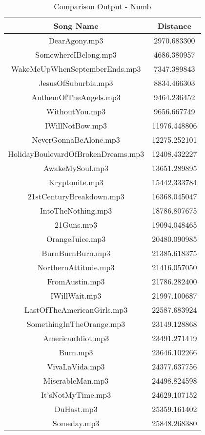 \documentclass[conference]{IEEEtran}
\begin{document}
\begin{table}[htbp]
  \caption{Comparison Output - Numb}
  \label{CompTab2}
  \begin{center}
    \begin{tabular}{|c|c|}
      \hline
      \textbf{Song Name} & \textbf{Distance} \\
      \hline
      DearAgony.mp3 &  2970.683300\\
      SomewhereIBelong.mp3 & 4686.380957\\
      WakeMeUpWhenSeptemberEnds.mp3 &  7347.389843\\
      JesusOfSuburbia.mp3 &  8834.466303\\
      AnthemOfTheAngels.mp3 &  9464.236452\\
      WithoutYou.mp3  & 9656.667749\\
      IWillNotBow.mp3 & 11976.448806\\
      NeverGonnaBeAlone.mp3 & 12275.252101\\
      HolidayBoulevardOfBrokenDreams.mp3 & 12408.432227\\
      AwakeMySoul.mp3 & 13651.289895\\
      Kryptonite.mp3 & 15442.333784\\
      21stCenturyBreakdown.mp3 & 16368.045047\\
      IntoTheNothing.mp3 & 18786.807675\\
      21Guns.mp3 & 19094.048465\\
      OrangeJuice.mp3 & 20480.090985\\
      BurnBurnBurn.mp3 & 21385.618375\\
      NorthernAttitude.mp3 & 21416.057050\\
      FromAustin.mp3 & 21786.282400\\
      IWillWait.mp3 & 21997.100687\\
      LastOfTheAmericanGirls.mp3 & 22587.683924\\
      SomethingInTheOrange.mp3 & 23149.128868\\
      AmericanIdiot.mp3 & 23491.271419\\
      Burn.mp3 & 23646.102266\\
      VivaLaVida.mp3 & 24377.637756\\
      MiserableMan.mp3 & 24498.824598\\
      It'sNotMyTime.mp3 & 24629.107152\\
      DuHast.mp3 & 25359.161402\\
      Someday.mp3 & 25848.268380\\

\end{tabular}
\end{center}
\end{table}
\end{document}
